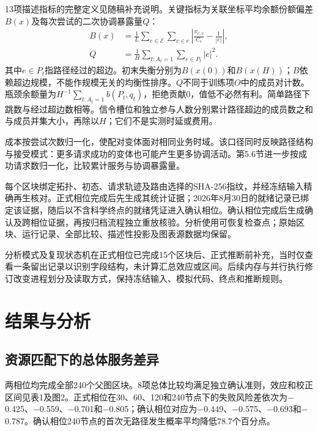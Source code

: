 \documentclass[UTF8,a4paper,twocolumn,fontset=none,zihao=5]{ctexart}
\begin{document}
13项描述指标的完整定义见随稿补充说明。关键指标为关联坐标平均余额份额偏差$B(x)$及每次尝试的二次协调暴露量$Q$：
\[
\begin{aligned}
B(x)&=\frac1L\sum_{e\in\mathcal E}\sum_{v\in e}\left|\frac{x_{e,v}}{C_e}-\frac1{|e|}\right|,\\
Q&=\frac1H\sum_{t:A_t=1}\sum_{e\in P_t}|e|^2.
\end{aligned}
\]
其中$e\in P_t$指路径经过的超边。初末失衡分别为$B(x(0))$和$B(x(H))$；$B$依赖超边规模，不能作规模无关的均衡性排序。$Q$不同于训练项$O$中的成员对计数。瓶颈余额量为$H^{-1}\sum_{t:A_t=1}b(P_t,q_t)$，拒绝贡献0，值低不必然有利。简单路径下跳数与经过超边数相等。信令槽位和独立参与人数分别累计路径超边的成员数之和与成员并集大小，再除以$H$；它们不是实测时延或费用。


成本按尝试次数归一化，使配对变体面对相同业务时域。该口径同时反映路径结构与接受模式：更多请求成功的变体也可能产生更多协调活动。第5.6节进一步按成功请求数归一化，比较累计服务与协调暴露量。


每个区块绑定拓扑、初态、请求轨迹及路由选择的SHA-256指纹，并经冻结输入精确再生核对。正式相位完成后先生成其统计证据；2026年8月30日的就绪记录已绑定该证据，随后以不含科学终点的就绪凭证进入确认相位。确认相位完成后生成确认及跨相位证据，再按归档流程独立重放核验。分析使用可恢复检查点；原始区块、运行记录、全部比较、描述性投影及图表源数据均保留。


分析模式及复现状态机在正式相位已完成15个区块后、正式推断前补充，当时仅查看一条留出记录以识别字段结构，未计算汇总效应或区间。后续内存与并行执行修订改变进程划分及读取方式，保持冻结输入、模拟代码、终点和推断规则。


\section{结果与分析}

\subsection{资源匹配下的总体服务差异}

两相位均完成全部240个父图区块。8项总体比较均满足独立确认准则，效应和校正区间见表1及图2。正式相位在30、60、120和240节点下的失败风险差依次为$-$0.425、$-$0.559、$-$0.701和$-$0.805；确认相位对应为$-$0.449、$-$0.575、$-$0.693和$-$0.787。确认相位240节点的首次无路径发生概率平均降低78.7个百分点。
\end{document}

